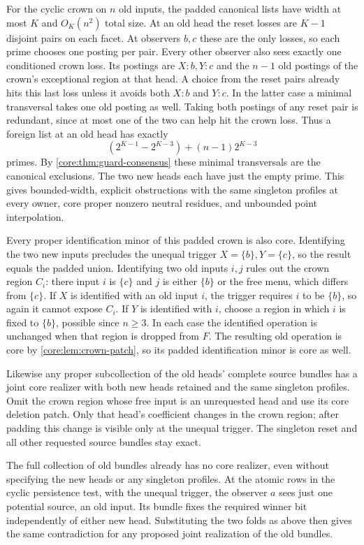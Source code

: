 For the cyclic crown on $n$ old inputs, the padded
canonical lists have width at most $K$ and
$O_K(n^2)$ total size. At an old head the reset
losses are $K-1$ disjoint pairs on each facet.
At observers $b,c$ these are the only losses, so
each prime chooses one posting per pair. Every
other observer also sees exactly one conditioned
crown loss. Its postings are $X:b,Y:c$ and the
$n-1$ old postings of the crown's exceptional
region at that head. A choice from the reset pairs
already hits this last loss unless it avoids both
$X:b$ and $Y:c$. In the latter case a minimal
transversal takes one old posting as well. Taking
both postings of any reset pair is redundant, since
at most one of the two can help hit the crown loss.
Thus a foreign list at an old head has exactly
\[
 (2^{K-1}-2^{K-3})+(n-1)2^{K-3}
\]
primes. By \cref{core:thm:guard-consensus} these
minimal transversals are the canonical exclusions.
The two new heads each have just the empty prime.
This gives bounded-width, explicit obstructions
with the same singleton profiles at every owner,
core proper nonzero neutral residues, and unbounded
point interpolation.

Every proper identification minor of this padded
crown is also core. Identifying the two new inputs
precludes the unequal trigger $X=\{b\},Y=\{c\}$,
so the result equals the padded union. Identifying
two old inputs $i,j$ rules out the crown region
$C_i$: there input $i$ is $\{c\}$ and $j$ is
either $\{b\}$ or the free menu, which differs
from $\{c\}$. If $X$ is identified with an old
input $i$, the trigger requires $i$ to be $\{b\}$,
so again it cannot expose $C_i$. If $Y$ is
identified with $i$, choose a region in which $i$
is fixed to $\{b\}$, possible since $n\ge3$.
In each case the identified operation is unchanged
when that region is dropped from $F$. The
resulting old operation is core by
\cref{core:lem:crown-patch}, so its padded
identification minor is core as well.

Likewise any proper subcollection of the old heads'
complete source bundles has a joint core realizer
with both new heads retained and the same singleton
profiles. Omit the crown region whose free input
is an unrequested head and use its core deletion
patch. Only that head's coefficient changes in the
crown region; after padding this change is visible
only at the unequal trigger. The singleton reset
and all other requested source bundles stay exact.

The full collection of old bundles already has no
core realizer, even without specifying the new
heads or any singleton profiles. At the atomic
rows in the cyclic persistence test, with the
unequal trigger, the observer $a$ sees just one
potential source, an old input. Its bundle fixes
the required winner bit independently of either
new head. Substituting the two folds as above
then gives the same contradiction for any proposed
joint realization of the old bundles.

